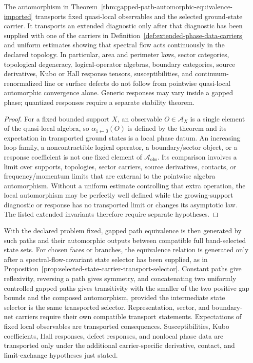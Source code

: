 \begin{proposition}
\label{prop:extended-phase-data-transport-boundary}
The automorphism in
Theorem~\ref{thm:gapped-path-automorphic-equivalence-imported} transports
fixed quasi-local observables and the selected ground-state carrier.  It
transports an extended diagnostic only after that diagnostic has been supplied
with one of the carriers in
Definition~\ref{def:extended-phase-data-carriers} and uniform estimates
showing that spectral flow acts continuously in the declared topology.  In
particular, area and perimeter laws, sector categories, topological
degeneracy, logical-operator algebras, boundary categories, source
derivatives, Kubo or Hall response tensors, susceptibilities, and
continuum-renormalized line or surface defects do not follow from pointwise
quasi-local automorphic convergence alone.  Generic responses may vary inside a
gapped phase; quantized responses require a separate stability theorem.
\end{proposition}

\begin{proof}
For a fixed bounded support \(X\), an observable \(O\in\mathcal A_X\) is a
single element of the quasi-local algebra, so
\(\alpha_{1\leftarrow0}(O)\) is defined by the theorem and its expectation in
transported ground states is a local phase datum.  An increasing loop family,
a noncontractible logical operator, a boundary/sector object, or a response
coefficient is not one fixed element of \(\mathcal A_{\mathrm{obs}}\).  Its
comparison involves a limit over supports, topologies, sector carriers, source
derivatives, contacts, or frequency/momentum limits that are external to the
pointwise algebra automorphism.  Without a uniform estimate controlling that
extra operation, the local automorphism may be perfectly well defined while the
growing-support diagnostic or response has no transported limit or changes its
asymptotic law.  The listed extended invariants therefore require separate
hypotheses.
\end{proof}

With the declared problem fixed, gapped path equivalence is then generated by
such paths and their automorphic outputs between compatible full band-selected
state sets.  For chosen faces or branches, the equivalence relation is generated
only after a spectral-flow-covariant state selector has been supplied, as in
Proposition~\ref{prop:selected-state-carrier-transport-selector}.  Constant
paths give reflexivity, reversing a path gives symmetry, and concatenating two
uniformly controlled gapped paths gives transitivity with the smaller of the
two positive gap bounds and the composed automorphism, provided the intermediate
state selector is the same transported selector.  Representation, sector, and
boundary-net carriers require their own compatible transport statements.
Expectations of fixed local observables are transported consequences.
Susceptibilities, Kubo coefficients, Hall responses, defect responses, and
nonlocal phase data are transported only under the additional carrier-specific
derivative, contact, and limit-exchange hypotheses just stated.

